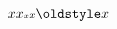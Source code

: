 $
      {\textstyle x}
      {\displaystyle x}
      {\scriptscriptstyle x}
      {\scriptstyle x}
      {\oldstyle x}
$
